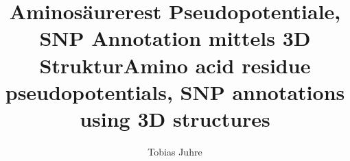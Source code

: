 \documentclass[master,german]{hgbthesis}
\begin{document}

\title{Aminosäurerest Pseudopotentiale, SNP Annotation mittels 3D Struktur\texorpdfstring{\newline \newline }{}Amino acid residue pseudopotentials, SNP annotations using 3D structures}
\author{Tobias Juhre}




\frontmatter
\maketitle
\tableofcontents






\mainmatter         %











\appendix

\printbibliography  %


\end{document}
